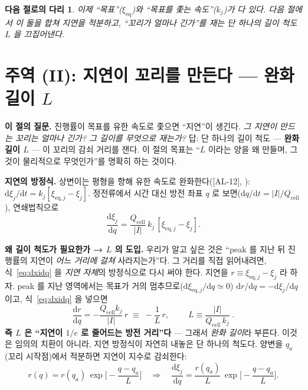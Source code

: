 \documentclass[11pt,a4paper]{article}
\newtheorem*{bridgebox}{다음 절로의 다리}
\newcommand{\dd}{\mathrm{d}}
\newcommand{\eq}{\mathrm{eq}}
\newcommand{\cell}{\mathrm{cell}}
\newcommand{\AL}[1]{\textsf{[AL-#1]}}
\begin{document}
\begin{bridgebox}
이제 ``목표''($\xi_\eq$)와 ``목표를 좇는 속도''($k_j$)가 다 있다. 다음 절에서 이 둘을 합쳐 \emph{지연}을
적분하고, ``꼬리가 얼마나 긴가''를 재는 단 하나의 길이 척도 $L$ 을 끄집어낸다.
\end{bridgebox}

\section{주역 (II): 지연이 꼬리를 만든다 — 완화 길이 $L$}\label{sec:relax}
\textbf{이 절의 질문.} 진행률이 목표를 유한 속도로 좇으면 ``지연''이 생긴다. \emph{그 지연이 만드는 꼬리는
얼마나 긴가? 그 길이를 무엇으로 재는가?} 답: 단 하나의 길이 척도 — \textbf{완화 길이 $L$} — 이 꼬리의 감쇠
거리를 잰다. 이 절의 목표는 ``$L$ 이라는 양을 왜 만들며, 그것이 물리적으로 무엇인가''를 명확히 하는 것이다.

\textbf{지연의 방정식.} 상변이는 평형을 향해 유한 속도로 완화한다(\AL{12}, \cite{onsager1931}):
$\dd\xi_j/\dd t=k_j[\xi_{\eq,j}-\xi_j]$. 정전류에서 시간 대신 방전 좌표 $q$ 로 보면($\dd q/\dd t=|I|/Q_\cell$),
연쇄법칙으로
\begin{equation}
\frac{\dd\xi_j}{\dd q}=\frac{Q_\cell}{|I|}\,k_j\,[\xi_{\eq,j}-\xi_j].
\label{eq:dxidq}
\end{equation}

\textbf{왜 길이 척도가 필요한가 → $L$ 의 도입.} 우리가 알고 싶은 것은 ``peak 를 지난 뒤 진행률의 지연이
\emph{어느 거리에 걸쳐} 사라지는가''다. 그 거리를 직접 읽어내려면, 식~\eqref{eq:dxidq} 을 \emph{지연 자체}의
방정식으로 다시 써야 한다. 지연을 $r\equiv\xi_{\eq,j}-\xi_j$ 라 하자. peak 를 지난 영역에서는 목표가 거의
멈추므로($\dd\xi_{\eq,j}/\dd q\simeq0$) $\dd r/\dd q=-\dd\xi_j/\dd q$ 이고, 식~\eqref{eq:dxidq} 을 넣으면
\begin{equation}
\frac{\dd r}{\dd q}=-\frac{Q_\cell k_j}{|I|}\,r\;\equiv\;-\frac{1}{L}\,r,
\qquad\boxed{\;L\equiv\frac{|I|}{Q_\cell\,k_j}\;.}
\label{eq:Ldef}
\end{equation}
\textbf{즉 $L$ 은 ``지연이 $1/e$ 로 줄어드는 방전 거리''다} — 그래서 \emph{완화 길이}라 부른다. 이것은 임의의
치환이 아니라, 지연 방정식이 자연히 내놓은 단 하나의 척도다. 양변을 $q_a$(꼬리 시작점)에서 적분하면 지연이
지수로 감쇠한다:
\begin{equation}
r(q)=r(q_a)\,\exp\!\Big[-\frac{q-q_a}{L}\Big]
\quad\Longrightarrow\quad
\frac{\dd\xi_j}{\dd q}=\frac{r(q_a)}{L}\,\exp\!\Big[-\frac{q-q_a}{L}\Big].
\label{eq:single_kernel}
\end{equation}
\end{document}
